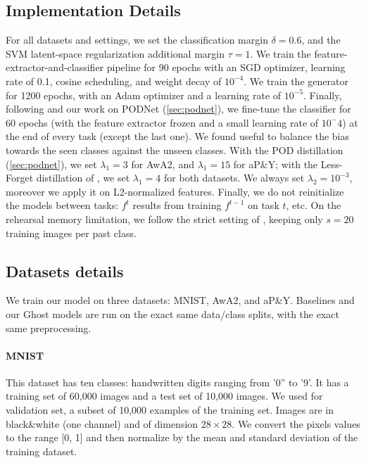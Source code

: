 \subsection{Implementation Details} For all datasets and settings, we set the classification margin
$\delta=0.6$, and the SVM latent-space regularization additional margin $\tau=1$. We train the
feature-extractor-and-classifier pipeline for 90 epochs with an SGD optimizer, learning rate of 0.1,
cosine scheduling, and weight decay of $10^{-4}$. We train the generator for 1200 epochs, with an
Adam optimizer and a learning rate of $10^{-5}$. Finally, following \citet{hou2019ucir} and our work
on PODNet (\autoref{sec:podnet}), we fine-tune the classifier for 60 epochs (with the feature
extractor frozen and a small learning rate of $10^-4$) at the end of every task (except the last
one). We found useful to balance the bias towards the seen classes against the unseen classes. With
the POD distillation (\autoref{sec:podnet}), we set $\lambda_1=3$  for AwA2, and $\lambda_1=15$ for
aP\&Y; with the Less-Forget distillation of \citet{hou2019ucir}, we set $\lambda_1=4$ for both
datasets. We always set $\lambda_2=10^{-3}$, moreover we apply it on L2-normalized features.
Finally, we do not reinitialize the models between tasks: $f^t$ results from training $f^{t-1}$ on
task $t$, etc. On the rehearsal memory limitation, we follow the strict setting of
\citet{hou2019ucir}, keeping only $s=20$ training images per past class.

\subsection{Datasets details}

We train our model on three datasets: MNIST, AwA2, and aP\&Y. Baselines and our Ghost models are run
on the exact same data/class splits, with the exact same preprocessing.

\paragraph{MNIST} This dataset has ten classes: handwritten digits ranging from '0'' to '9'. It has
a training set of 60,000 images and a test set of 10,000 images. We used for validation set, a
subset of 10,000 examples of the training set. Images are in black\&white (one channel) and of
dimension $28\times28$. We convert the pixels values to the range [0, 1] and then normalize by the
mean and standard deviation of the training dataset.

